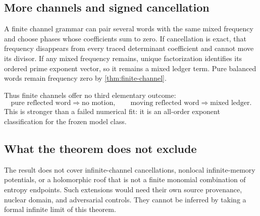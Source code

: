 \subsection{More channels and signed cancellation}

A finite channel grammar can pair several words with the same mixed frequency
and choose phases whose coefficients sum to zero.  If cancellation is exact,
that frequency disappears from every traced determinant coefficient and
cannot move its divisor.  If any mixed frequency remains, unique
factorization identifies its ordered prime exponent vector, so it remains a
mixed ledger term.  Pure balanced words remain frequency zero by
\cref{thm:finite-channel}.

Thus finite channels offer no third elementary outcome:
\[
 \boxed{
 \text{pure reflected word}\Rightarrow\text{no motion},
 \qquad
 \text{moving reflected word}\Rightarrow\text{mixed ledger}.}
\]
This is stronger than a failed numerical fit: it is an all-order exponent
classification for the frozen model class.

\subsection{What the theorem does not exclude}

The result does not cover infinite-channel cancellations, nonlocal
infinite-memory potentials, or a holomorphic roof that is not a finite
monomial combination of entropy endpoints.  Such extensions would need
their own source provenance, nuclear domain, and adversarial controls.  They
cannot be inferred by taking a formal infinite limit of this theorem.
